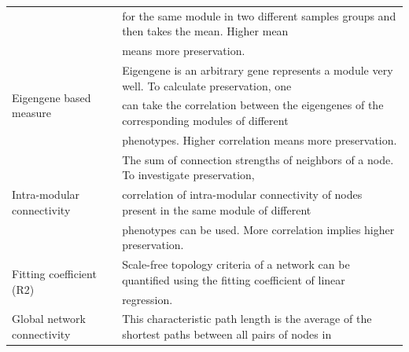 \begin{table}[h!]
{\begin{tabular}{@{}ll@{}}
                                                                                            & for the same module in two different samples groups and then takes the mean. Higher mean            \\
                                                                                            & means more preservation.                                                                            \\
\multirow{3}{*}{Eigengene based measure}                                                    & Eigengene is an arbitrary gene represents a module very well. To calculate preservation, one        \\
                                                                                            & can take the correlation between the eigengenes of the corresponding modules of different           \\
                                                                                            & phenotypes. Higher correlation means more preservation.                                             \\
\multirow{3}{*}{Intra-modular connectivity}                                                 & The sum of connection strengths of neighbors of a node. To investigate preservation,                \\
                                                                                            & correlation of intra-modular connectivity of nodes present in the same module of different          \\
                                                                                            & phenotypes can be used. More correlation implies higher preservation.                               \\
\multirow{2}{*}{Fitting coefficient (R2) \cite{Zhang2005a}}                                          & Scale-free topology criteria of a network can be quantified using the fitting coefficient of linear \\
                                                                                            & regression.                                                                                         \\
\multirow{2}{*}{Global network connectivity \cite{Taylor2009Feb}}                                      & This characteristic path length is the average of the shortest paths between all pairs of nodes in  \\

\end{tabular}}
\end{table}

